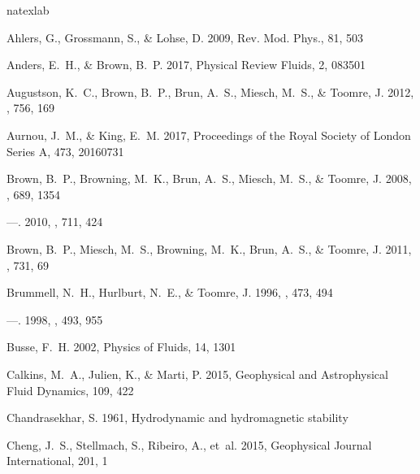 \documentclass[twocolumn, amsmath, amsfonts, amssymb, trackchanges]{aastex62}
\begin{document}
\begin{thebibliography}{}
\expandafter\ifx\csname natexlab\endcsname\relax\def\natexlab#1{#1}\fi

Ahlers, G., Grossmann, S., \& Lohse, D. 2009, Rev. Mod. Phys., 81, 503

{Anders}, E.~H., \& {Brown}, B.~P. 2017, Physical Review Fluids, 2, 083501

{Augustson}, K.~C., {Brown}, B.~P., {Brun}, A.~S., {Miesch}, M.~S., \&
  {Toomre}, J. 2012, \apj, 756, 169

{Aurnou}, J.~M., \& {King}, E.~M. 2017, Proceedings of the Royal Society of
  London Series A, 473, 20160731

{Brown}, B.~P., {Browning}, M.~K., {Brun}, A.~S., {Miesch}, M.~S., \& {Toomre},
  J. 2008, \apj, 689, 1354

---. 2010, \apj, 711, 424

{Brown}, B.~P., {Miesch}, M.~S., {Browning}, M.~K., {Brun}, A.~S., \& {Toomre},
  J. 2011, \apj, 731, 69

{Brummell}, N.~H., {Hurlburt}, N.~E., \& {Toomre}, J. 1996, \apj, 473, 494

---. 1998, \apj, 493, 955

{Busse}, F.~H. 2002, Physics of Fluids, 14, 1301

{Calkins}, M.~A., {Julien}, K., \& {Marti}, P. 2015, Geophysical and
  Astrophysical Fluid Dynamics, 109, 422

{Chandrasekhar}, S. 1961, {Hydrodynamic and hydromagnetic stability}

{Cheng}, J.~S., {Stellmach}, S., {Ribeiro}, A., {et~al.} 2015, Geophysical
  Journal International, 201, 1


\end{thebibliography}
\end{document}
